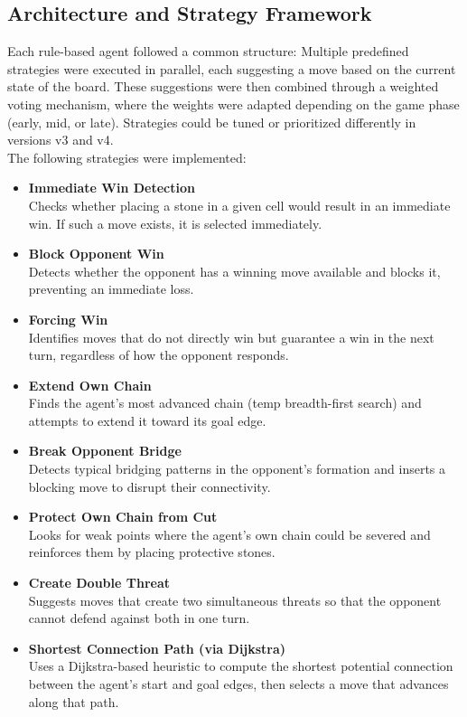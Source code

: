 \documentclass[conference]{IEEEtran}
\begin{document}
\subsection{Architecture and Strategy Framework} \label{ASF}
Each rule-based agent followed a common structure: Multiple predefined strategies were executed in parallel, each suggesting a move based on the current state of the board. These suggestions were then combined through a weighted voting mechanism, where the weights were adapted depending on the game phase (early, mid, or late). Strategies could be tuned or prioritized differently in versions v3 and v4.\\
The following strategies were implemented:
\begin{itemize}[]
\item \textbf{Immediate Win Detection} \\
Checks whether placing a stone in a given cell would result in an immediate win. If such a move exists, it is selected immediately.
\item \textbf{Block Opponent Win} \\
Detects whether the opponent has a winning move available and blocks it, preventing an immediate loss.
\item \textbf{Forcing Win} \\
Identifies moves that do not directly win but guarantee a win in the next turn, regardless of how the opponent responds.
\item \textbf{Extend Own Chain} \\
Finds the agent’s most advanced chain (temp breadth-first search) and attempts to extend it toward its goal edge.
\item \textbf{Break Opponent Bridge} \\
Detects typical bridging patterns in the opponent’s formation and inserts a blocking move to disrupt their connectivity.
\item \textbf{Protect Own Chain from Cut} \\
Looks for weak points where the agent’s own chain could be severed and reinforces them by placing protective stones.
\item \textbf{Create Double Threat} \\
Suggests moves that create two simultaneous threats so that the opponent cannot defend against both in one turn.
\item \textbf{Shortest Connection Path (via Dijkstra)} \\
Uses a Dijkstra-based heuristic to compute the shortest potential connection between the agent’s start and goal edges, then selects a move that advances along that path.

\end{itemize}
\end{document}
